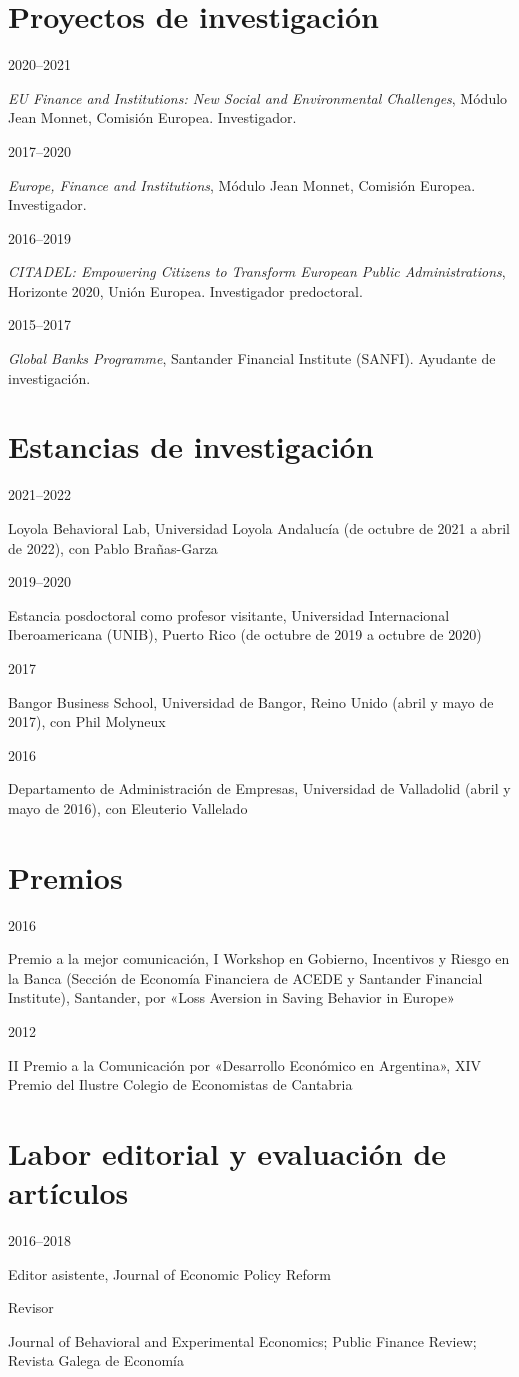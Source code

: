 \documentclass[11pt,a4paper]{article}
\newcommand{\entry}[2]{\begin{minipage}[t]{2.6cm}\sffamily\small\textcolor{muted}{#1}\end{minipage}%
  \begin{minipage}[t]{\linewidth-2.6cm}\raggedright #2\end{minipage}\par\vspace{4pt}}
\begin{document}
\section{Proyectos de investigación}
\entry{2020–2021}{\emph{EU Finance and Institutions: New Social and Environmental Challenges}, Módulo Jean Monnet, Comisión Europea. Investigador.}
\entry{2017–2020}{\emph{Europe, Finance and Institutions}, Módulo Jean Monnet, Comisión Europea. Investigador.}
\entry{2016–2019}{\emph{CITADEL: Empowering Citizens to Transform European Public Administrations}, Horizonte 2020, Unión Europea. Investigador predoctoral.}
\entry{2015–2017}{\emph{Global Banks Programme}, Santander Financial Institute (SANFI). Ayudante de investigación.}

\section{Estancias de investigación}
\entry{2021–2022}{Loyola Behavioral Lab, Universidad Loyola Andalucía (de octubre de 2021 a abril de 2022), con Pablo Brañas-Garza}
\entry{2019–2020}{Estancia posdoctoral como profesor visitante, Universidad Internacional Iberoamericana (UNIB), Puerto Rico (de octubre de 2019 a octubre de 2020)}
\entry{2017}{Bangor Business School, Universidad de Bangor, Reino Unido (abril y mayo de 2017), con Phil Molyneux}
\entry{2016}{Departamento de Administración de Empresas, Universidad de Valladolid (abril y mayo de 2016), con Eleuterio Vallelado}

\section{Premios}
\entry{2016}{Premio a la mejor comunicación, I Workshop en Gobierno, Incentivos y Riesgo en la Banca (Sección de Economía Financiera de ACEDE y Santander Financial Institute), Santander, por «Loss Aversion in Saving Behavior in Europe»}
\entry{2012}{II Premio a la Comunicación por «Desarrollo Económico en Argentina», XIV Premio del Ilustre Colegio de Economistas de Cantabria}

\section{Labor editorial y evaluación de artículos}
\entry{2016–2018}{Editor asistente, Journal of Economic Policy Reform}
\entry{Revisor}{Journal of Behavioral and Experimental Economics; Public Finance Review; Revista Galega de Economía}
\end{document}
